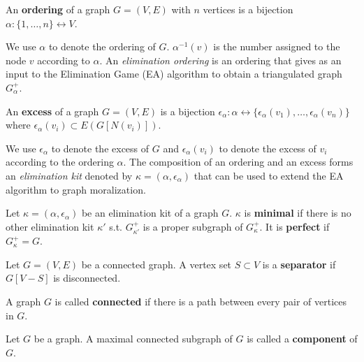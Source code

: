 \begin{definition}
An \textbf{ordering} of a graph $G=(V,E)$ with $n$ vertices is a bijection $\alpha: \{1, \dots, n\} \leftrightarrow V$. 
\end{definition}
We use $\alpha$ to denote the ordering of $G$. $\alpha^{-1}(v)$ is the number assigned to the node $v$ according to $\alpha$. An \textit{elimination ordering} is an ordering that gives as an input to the Elimination Game (EA) algorithm \cite{fulkerson1965incidence} to obtain a triangulated graph $G_{\alpha}^+$.  

\begin{definition}
An \textbf{excess} of a graph $G=(V,E)$ is a bijection $\epsilon_{\alpha}: \alpha \leftrightarrow \{\epsilon_{\alpha}(v_1), \dots, \epsilon_{\alpha}(v_n)\}$ where $\epsilon_{\alpha}(v_i) \subset E(G[N(v_i)])$.
\end{definition}
We use $\epsilon_{\alpha}$ to denote the excess of $G$ and $\epsilon_{\alpha}(v_i)$ to denote the excess of $v_i$ according to the ordering $\alpha$. The composition of an ordering and an excess forms an \textit{elimination kit} denoted by $\kappa=(\alpha,\epsilon_{\alpha})$ that can be used to extend the EA algorithm to graph moralization. 

\iffalse
\begin{definition}
Let $\kappa=(\alpha,\epsilon_{\alpha})$ be an elimination kit of a graph $G$. $\kappa$ is \textbf{minimal} if $G_{\kappa}^+$ is a minimal moralization of $G$. 
\end{definition}
\fi

\begin{definition}
Let $\kappa=(\alpha,\epsilon_{\alpha})$ be an elimination kit of a graph $G$. $\kappa$ is \textbf{minimal} if there is no other elimination kit $\kappa'$ s.t. $G_{\kappa'}^+$ is a proper subgraph of $G_{\kappa}^+$. It is \textbf{perfect} if $G_{\kappa}^+=G$. 
\end{definition}

\begin{definition}
Let $G=(V,E)$ be a connected graph. A vertex set $S\subset V$ is a \textbf{separator} if $G[V-S]$ is disconnected. 
\end{definition}

\begin{definition}
A graph $G$ is called \textbf{connected} if there is a path between every pair of vertices in $G$. 
\end{definition}

\begin{definition}
Let $G$ be a graph. A maximal connected subgraph of $G$ is called a \textbf{component} of $G$. 
\end{definition}

